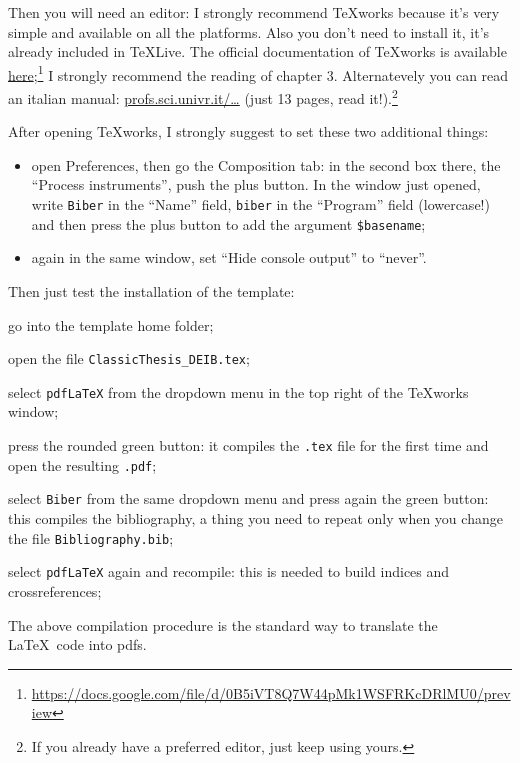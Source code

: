 Then you will need an editor: I strongly recommend TeXworks because it's very simple and available on all the platforms.
Also you don't need to install it, it's already included in TeXLive.
The official documentation of TeXworks is available \href{https://docs.google.com/file/d/0B5iVT8Q7W44pMk1WSFRKcDRlMU0/preview}{here};\footnote{\url{https://docs.google.com/file/d/0B5iVT8Q7W44pMk1WSFRKcDRlMU0/preview}}
I strongly recommend the reading of chapter 3.
Alternatevely you can read an italian manual: \href{http://profs.sci.univr.it/~gregorio/introtexworks.pdf}{profs.sci.univr.it/\ldots} (just 13 pages, read it!).\footnote{If you already have a preferred editor, just keep using yours.}

After opening TeXworks, I strongly suggest to set these two additional things:
\begin{itemize}
	\item open Preferences, then go the Composition tab: in the second box there, the \enquote{Process instruments}, push the plus button.
	In the window just opened, write \verb!Biber! in the \enquote{Name} field, \verb!biber! in the \enquote{Program} field (lowercase!) and then press the plus button to add the argument \verb!$basename!;
	\item again in the same window, set \enquote{Hide console output} to \enquote{never}.
\end{itemize}

Then just test the installation of the template:
\begin{aenumerate}
	\item go into the template home folder;
	\item open the file \verb!ClassicThesis_DEIB.tex!;
	\item select \verb!pdfLaTeX! from the dropdown menu in the top right of the TeXworks window;
	\item press the rounded green button: it compiles the \verb!.tex! file for the first time and open the resulting \verb!.pdf!;
	\item select \verb!Biber! from the same dropdown menu and press again the green button: this compiles the bibliography, a thing you need to repeat only when you change the file \verb!Bibliography.bib!;
	\item select \verb!pdfLaTeX! again and recompile: this is needed to build indices and crossreferences;
\end{aenumerate}
The above compilation procedure is the standard way to translate the \LaTeX\ code into pdfs.

